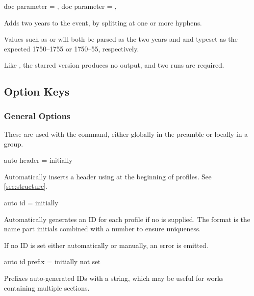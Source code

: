 \documentclass[
	a4paper,
]{article}
\begin{document}
\begin{docCommands}[
		doc name = {gprYears}
	]
	{
		{ doc parameter = {}},
		{ doc parameter = {\sarg{}}},
	}

	Adds two years to the  event, by splitting at one or more hyphens.

	Values such as  or  will both be parsed as the two years  and  and typeset as the expected 1750--1755 or 1750--55, respectively.

	Like , the starred version produces no output, and two runs are required.
\end{docCommands}


\subsection{Option Keys} %

\subsubsection{General Options} %

\label{sec:genconf}
These are used with the  command, either globally in the preamble or locally in a group.

\begin{docKey}
	{auto header}
	{=}
	{initially }

	Automatically inserts a header using  at the beginning of profiles. See \cref{sec:structure}.
\end{docKey}

\begin{docKey}
	{auto id}
	{=}
	{initially }

	Automatically generates an ID for each profile if no  is supplied. The format is the name part initials combined with a number to ensure uniqueness.

	If no ID is set either automatically or manually, an error is emitted.
\end{docKey}

\begin{docKey}
	{auto id prefix}
	{=}
	{initially not set}

	Prefixes auto-generated IDs with a string, which may be useful for works containing multiple sections.
\end{docKey}
\end{document}
